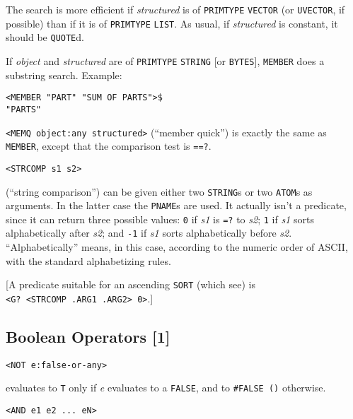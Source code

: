 \documentclass[a4paper]{scrbook}
\begin{document}
The search is more efficient if \emph{structured} is of \texttt{PRIMTYPE} \texttt{VECTOR} (or \texttt{UVECTOR}, if
possible) than if it is of \texttt{PRIMTYPE} \texttt{LIST}. As usual, if \emph{structured} is constant, it should be
\texttt{QUOTE}d.

If \emph{object} and \emph{structured} are of \texttt{PRIMTYPE} \texttt{STRING} {[}or \texttt{BYTES}{]}, \texttt{MEMBER}
does a substring search. Example:

\begin{verbatim}
<MEMBER "PART" "SUM OF PARTS">$
"PARTS"
\end{verbatim}

\texttt{\textless{}MEMQ\ object:any\ structured\textgreater{}} (``member quick'') is exactly
the same as \texttt{MEMBER}, except that the comparison test is \texttt{==?}.

\begin{verbatim}
<STRCOMP s1 s2>
\end{verbatim}

 (``string comparison'') can be given either two \texttt{STRING}s or two \texttt{ATOM}s as
arguments. In the latter case the \texttt{PNAME}s are used. It actually isn't a predicate, since it can return three
possible values: \texttt{0} if \emph{s1} is \texttt{=?} to \emph{s2}; \texttt{1} if \emph{s1} sorts alphabetically after
\emph{s2}; and \texttt{-1} if \emph{s1} sorts alphabetically before \emph{s2}. ``Alphabetically'' means, in this case,
according to the numeric order of ASCII, with the standard alphabetizing rules.

{[}A predicate suitable for an ascending \texttt{SORT} (which see) is
\texttt{\textless{}G?\ \textless{}STRCOMP\ .ARG1\ .ARG2\textgreater{}\ 0\textgreater{}}.{]}

\subsection{Boolean Operators {[}1{]}}\label{boolean-operators-1}

\begin{verbatim}
<NOT e:false-or-any>
\end{verbatim}

 evaluates to \texttt{T} only if \emph{e} evaluates to a \texttt{FALSE}, and to
\texttt{\#FALSE\ ()} otherwise.

\begin{verbatim}
<AND e1 e2 ... eN>
\end{verbatim}
\end{document}
